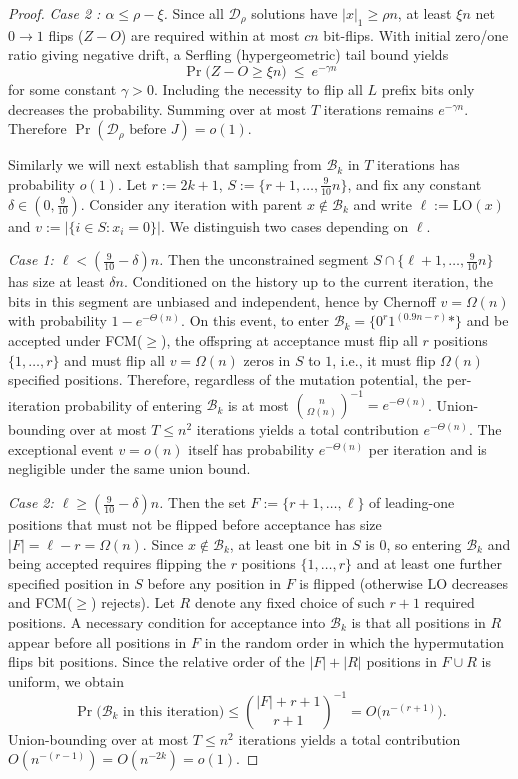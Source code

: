\begin{proof}
	\emph{Case 2 : $\alpha\le \rho-\xi$.}
	Since all $\mathcal{D}_\rho$ solutions have $|x|_1\ge \rho n$, at least $\xi n$ net $0\!\to\!1$ flips ($Z-O$) are required within at most
	$cn$ bit-flips. With initial zero/one ratio giving negative drift,
	a Serfling (hypergeometric) tail bound yields
	\[
	\Pr\bigl(Z-O\ge \xi n\bigr)\ \le\ e^{-\gamma n}
	\]
	for some constant $\gamma>0$. Including the necessity to flip all $L$ prefix bits only decreases the probability.
	Summing over at most $T$ iterations remains $e^{-\gamma n}$. Therefore $\Pr(\text{$\mathcal{D}_\rho$ before }J)=o(1)$.
	
	Similarly we will next establish that sampling from $\mathcal{B}_k$ in $T$ iterations  has probability $o(1)$.	Let $r:=2k{+}1$, $S:=\{r{+}1,\dots,\tfrac{9}{10}n\}$, and fix any constant
	$\delta\in(0,\tfrac{9}{10})$.  Consider any iteration with parent
	$x\notin\mathcal{B}_k$ and write $\ell:=\mathrm{LO}(x)$ and
	$v:=|\{i\in S:x_i=0\}|$.  We distinguish two cases depending on $\ell$.
	
	\emph{Case 1: $\ell < (\tfrac{9}{10}-\delta)n$.}
	Then the unconstrained segment
	$S\cap\{\ell{+}1,\dots,\tfrac{9}{10}n\}$ has size at least $\delta n$.
	Conditioned on the history up to the current iteration, the bits in this segment
	are unbiased and independent, hence by Chernoff $v=\Omega(n)$ with probability
	$1-e^{-\Theta(n)}$.  On this event, to enter
	$\mathcal{B}_k=\{0^{r}1^{(0.9n-r)}*\}$ and be accepted under FCM($\ge$), the
	offspring at acceptance must flip all $r$ positions $\{1,\dots,r\}$ and must flip
	all $v=\Omega(n)$ zeros in $S$ to $1$, i.e., it must flip $\Omega(n)$ specified
	positions.  Therefore, regardless of the mutation potential, the per-iteration
	probability of entering $\mathcal{B}_k$ is at most
	$\binom{n}{\Omega(n)}^{-1}=e^{-\Theta(n)}$.  Union-bounding over at most
	$T\le n^2$ iterations yields a total contribution $e^{-\Theta(n)}$.
	The exceptional event $v=o(n)$ itself has probability $e^{-\Theta(n)}$ per
	iteration and is negligible under the same union bound.
	
	\emph{Case 2: $\ell \ge (\tfrac{9}{10}-\delta)n$.}
	Then the set
	$F:=\{r{+}1,\dots,\ell\}$ of leading-one positions that must not be flipped before
	acceptance has size $|F|=\ell-r=\Omega(n)$.  Since $x\notin\mathcal{B}_k$, at
	least one bit in $S$ is $0$, so entering $\mathcal{B}_k$ and being accepted
	requires flipping the $r$ positions $\{1,\dots,r\}$ and at least one further
	specified position in $S$ before any position in $F$ is flipped (otherwise
	$\mathrm{LO}$ decreases and FCM($\ge$) rejects).  Let $R$ denote any fixed choice
	of such $r{+}1$ required positions.  A necessary condition for acceptance into
	$\mathcal{B}_k$ is that all positions in $R$ appear before all positions in $F$ in
	the random order in which the hypermutation flips bit positions.  Since the
	relative order of the $|F|+|R|$ positions in $F\cup R$ is uniform, we obtain
	\[
	\Pr\bigl(\mathcal{B}_k \text{ in this iteration}\bigr)
	\le
	\binom{|F|+r+1}{r+1}^{-1}
	=
	O\!\bigl(n^{-(r+1)}\bigr).
	\]
	Union-bounding over at most $T\le n^2$ iterations yields a total contribution
	$O(n^{-(r-1)})=O(n^{-2k})=o(1)$.
	

\end{proof}
